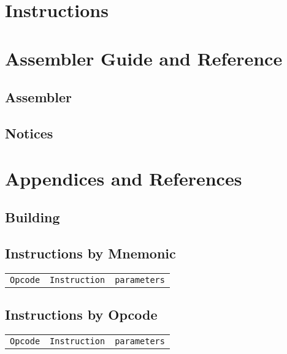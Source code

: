 
\mainmatter



\part{Instructions}



\clearpage

\part{Assembler Guide and Reference}

\chapter{\crexx{} Assembler}

\appendix


\chapter{Notices}

\part{Appendices and References}
\chapter{Building \crexx{}}


\chapter{Instructions by Mnemonic}
\begin{longtable}{lll}
  \toprule
  \texttt{Opcode} & \texttt{Instruction} & \texttt{parameters} \\
  
\end{longtable}


\chapter{Instructions by Opcode}
\begin{longtable}{lll}
  \toprule
  \texttt{Opcode} & \texttt{Instruction} & \texttt{parameters} \\
  
\end{longtable}

\backmatter
\listoftables
\printindex
